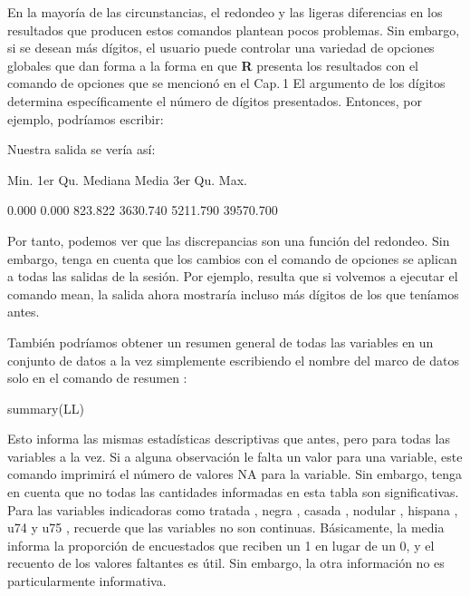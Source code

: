 \documentclass[
]{book}
\newenvironment{Shaded}{\begin{snugshade}}{\end{snugshade}}
\newcommand{\AttributeTok}[1]{\textcolor[rgb]{0.77,0.63,0.00}{#1}}
\newcommand{\DecValTok}[1]{\textcolor[rgb]{0.00,0.00,0.81}{#1}}
\newcommand{\FunctionTok}[1]{\textcolor[rgb]{0.00,0.00,0.00}{#1}}
\newcommand{\NormalTok}[1]{#1}
\newcommand{\SpecialCharTok}[1]{\textcolor[rgb]{0.00,0.00,0.00}{#1}}
\begin{document}
En la mayoría de las circunstancias, el redondeo y las ligeras diferencias en los resultados que producen estos comandos plantean pocos problemas. Sin embargo, si se desean más dígitos, el usuario puede controlar una variedad de opciones globales que dan forma a la forma en que \textbf{R} presenta los resultados con el comando de opciones que se mencionó en el Cap. 1 El argumento de los dígitos determina específicamente el número de dígitos presentados. Entonces, por ejemplo, podríamos escribir:

\begin{Shaded}
\end{Shaded}

Nuestra salida se vería así:

Min. 1er Qu. Mediana Media 3er Qu. Max.

0.000 0.000 823.822 3630.740 5211.790 39570.700

Por tanto, podemos ver que las discrepancias son una función del redondeo. Sin embargo, tenga en cuenta que los cambios con el comando de opciones se aplican a todas las salidas de la sesión. Por ejemplo, resulta que si volvemos a ejecutar el comando mean, la salida ahora mostraría incluso más dígitos de los que teníamos antes.

También podríamos obtener un resumen general de todas las variables en un conjunto de datos a la vez simplemente escribiendo el nombre del marco de datos solo en el comando de resumen :

\begin{Shaded}
\begin{Highlighting}[]
\FunctionTok{summary}\NormalTok{(LL)}
\end{Highlighting}
\end{Shaded}

Esto informa las mismas estadísticas descriptivas que antes, pero para todas las variables a la vez. Si a alguna observación le falta un valor para una variable, este comando imprimirá el número de valores NA para la variable. Sin embargo, tenga en cuenta que no todas las cantidades informadas en esta tabla son significativas. Para las variables indicadoras como tratada , negra , casada , nodular , hispana , u74 y u75 , recuerde que las variables no son continuas. Básicamente, la media informa la proporción de encuestados que reciben un 1 en lugar de un 0, y el recuento de los valores faltantes es útil. Sin embargo, la otra información no es particularmente informativa.
\end{document}
